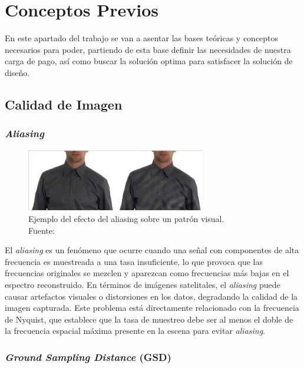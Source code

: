 \chapter{Conceptos Previos}\label{cap3}
\minitoc

En este apartado del trabajo se van a asentar las bases teóricas y conceptos necesarios para poder, partiendo de esta base definir las necesidades de nuestra carga de pago, así como buscar la solución optima para satisfacer la solución de diseño.


\newpage


\section{Calidad de Imagen}
\subsection{\textit{Aliasing}}


\begin{figure}[H]
    \centering
    \includegraphics[width=0.7\textwidth]{3.Conceptos_Previos/Moire effect.jpg}
    \caption{Ejemplo del efecto del aliasing sobre un patrón visual.\\ Fuente: \cite{kitdeactores2025moire}}
    \label{fig:Aliasing}
\end{figure}

El \textit{aliasing} es un fenómeno que ocurre cuando una señal con componentes de alta frecuencia es muestreada a una tasa insuficiente, lo que provoca que las frecuencias originales se mezclen y aparezcan como frecuencias más bajas en el espectro reconstruido. En términos de imágenes satelitales, el \textit{aliasing} puede causar artefactos visuales o distorsiones en los datos, degradando la calidad de la imagen capturada. Este problema está directamente relacionado con la frecuencia de Nyquist, que establece que la tasa de muestreo debe ser al menos el doble de la frecuencia espacial máxima presente en la escena para evitar \textit{aliasing}.

\subsection{\textit{Ground Sampling Distance} (GSD)}


